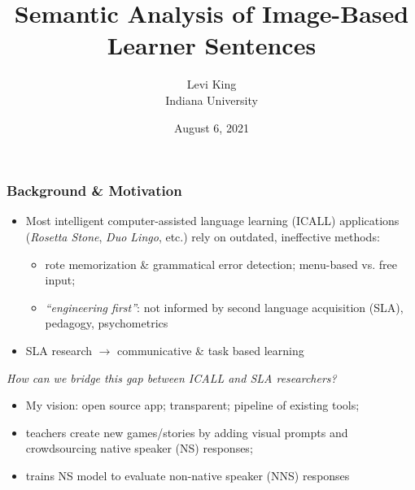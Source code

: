 \documentclass[handout,xcolor={dvipsnames}]{beamer}
\title{Semantic Analysis of Image-Based Learner Sentences}
\author[Levi King]{Levi King\\
Indiana University  }
\date{August 6, 2021}
\begin{document}
\maketitle
\begin{frame}
\frametitle{Background \& Motivation}
\begin{itemize}
\pause
\item Most intelligent computer-assisted language learning (ICALL) applications (\textit{Rosetta Stone}, \textit{Duo Lingo}, etc.) rely on outdated, ineffective methods:
\begin{itemize}
\pause
\item rote memorization \& grammatical error detection; menu-based vs. free input;
\pause
\item \textit{``engineering first''}: not informed by second language acquisition (SLA), pedagogy, psychometrics
\end{itemize}
\pause
\item  SLA research $\rightarrow$ communicative \& task based learning
\end{itemize}

\small
\pause
\textit{How can we bridge this gap between ICALL and SLA researchers?}

\begin{itemize}
\pause
\item My vision: \pause open source app; transparent; pipeline of existing tools;
\pause
\item teachers create new games/stories by adding visual prompts and crowdsourcing native speaker (NS) responses;
\pause
\item trains NS model to evaluate non-native speaker (NNS) responses
\end{itemize}
\end{frame}
\end{document}
